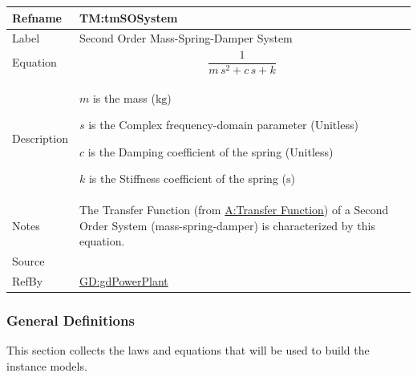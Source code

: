 \documentclass[12pt]{article}
\begin{document}
\medskip
\noindent
\begin{minipage}{\textwidth}
\begin{tabular}{>{\raggedright}p{}>{\raggedright\arraybackslash}p{}}
\toprule \textbf{Refname} & \textbf{TM:tmSOSystem}
\label{TM:tmSOSystem}
\\ \midrule
Label & Second Order Mass-Spring-Damper System
        
\\ \midrule
Equation & \begin{displaymath}
           \frac{1}{m\,s^{2}+c\,s+k}
           \end{displaymath}
\\ \midrule
Description & \begin{symbDescription}
              \item{$m$ is the mass (${\text{kg}}$)}
              \item{$s$ is the Complex frequency-domain parameter (Unitless)}
              \item{$c$ is the Damping coefficient of the spring (Unitless)}
              \item{$k$ is the Stiffness coefficient of the spring (${\text{s}}$)}
              \end{symbDescription}
\\ \midrule
Notes & The Transfer Function (from \hyperref[pwrPlantTxFnx]{A:Transfer Function}) of a Second Order System (mass-spring-damper) is characterized by this equation.
        
\\ \midrule
Source & \cite{abbasi2015}
         
\\ \midrule
RefBy & \hyperref[GD:gdPowerPlant]{GD:gdPowerPlant}
        
\\ \bottomrule
\end{tabular}
\end{minipage}

\subsubsection{General Definitions}
\label{Sec:GDs}
This section collects the laws and equations that will be used to build the instance models.
\end{document}
